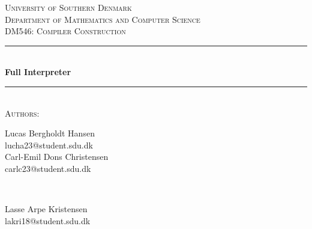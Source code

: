 \begin{titlepage}

\newcommand{\HRule}{\rule{\linewidth}{0.5mm}}

\center %


	\textsc{\LARGE University of Southern Denmark}\\[1.5cm]

	\textsc{\Large Department of Mathematics and Computer Science}\\[0.5cm]

	\textsc{\large DM546: Compiler Construction}\\[0.5cm]


	\HRule\\[0.7cm]

	{\huge\bfseries Full Interpreter}\\[0.4cm] %

	\HRule\\[1.0cm]

	\large
	\textsc{Authors:}\\ \bigskip
	\begin{minipage}[t]{0.45\textwidth}
	    \begin{center}
		    \normalsize
		    Lucas Bergholdt Hansen\\
		    lucha23@student.sdu.dk\\ \bigskip
		    Carl-Emil Dons Christensen\\
		    carlc23@student.sdu.dk\\ \bigskip

	   \end{center}
	\end{minipage}
	~
	\begin{minipage}[t]{0.45\textwidth}
	    \begin{center}
		    \normalsize
		    Lasse Arpe Kristensen\\
		    lakri18@student.sdu.dk\\ \bigskip
		\end{center}
	\end{minipage}
	


\end{titlepage}
